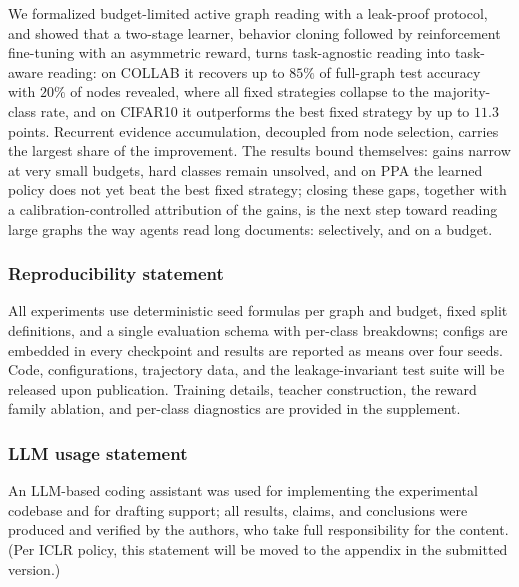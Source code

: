 \documentclass{article}
\begin{document}
We formalized budget-limited active graph reading with a leak-proof protocol, and showed that a two-stage learner, behavior cloning followed by reinforcement fine-tuning with an asymmetric reward, turns task-agnostic reading into task-aware reading: on COLLAB it recovers up to $85\%$ of full-graph test accuracy with $20\%$ of nodes revealed, where all fixed strategies collapse to the majority-class rate, and on CIFAR10 it outperforms the best fixed strategy by up to $11.3$ points. Recurrent evidence accumulation, decoupled from node selection, carries the largest share of the improvement. The results bound themselves: gains narrow at very small budgets, hard classes remain unsolved, and on PPA the learned policy does not yet beat the best fixed strategy; closing these gaps, together with a calibration-controlled attribution of the gains, is the next step toward reading large graphs the way agents read long documents: selectively, and on a budget.

\subsubsection*{Reproducibility statement}
All experiments use deterministic seed formulas per graph and budget, fixed split definitions, and a single evaluation schema with per-class breakdowns; configs are embedded in every checkpoint and results are reported as means over four seeds. Code, configurations, trajectory data, and the leakage-invariant test suite will be released upon publication. Training details, teacher construction, the reward family ablation, and per-class diagnostics are provided in the supplement.

\subsubsection*{LLM usage statement}
An LLM-based coding assistant was used for implementing the experimental codebase and for drafting support; all results, claims, and conclusions were produced and verified by the authors, who take full responsibility for the content. (Per ICLR policy, this statement will be moved to the appendix in the submitted version.)
\end{document}
